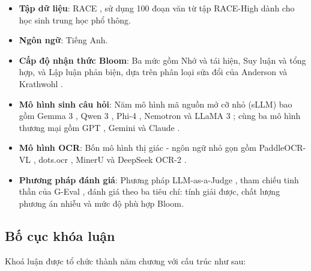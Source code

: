 \begin{itemize}
    \item \textbf{Tập dữ liệu}: RACE \cite{lai2017race}, sử dụng 100 đoạn văn từ tập RACE-High dành cho học sinh trung học phổ thông.
    \item \textbf{Ngôn ngữ}: Tiếng Anh.
    \item \textbf{Cấp độ nhận thức Bloom}: Ba mức gồm Nhớ và tái hiện, Suy luận và tổng hợp, và Lập luận phản biện, dựa trên phân loại sửa đổi của Anderson và Krathwohl \cite{anderson2001taxonomy}.
    \item \textbf{Mô hình sinh câu hỏi}: Năm mô hình mã nguồn mở cỡ nhỏ (sLLM) bao gồm Gemma 3 \cite{gemma2025}, Qwen 3 \cite{qwen2025}, Phi-4 \cite{phi4_2024}, Nemotron \cite{nemotron2025} và LLaMA 3 \cite{llama2024}; cùng ba mô hình thương mại gồm GPT \cite{gpt5_2025}, Gemini \cite{gemini2025} và Claude \cite{claude2025}.
    \item \textbf{Mô hình OCR}: Bốn mô hình thị giác - ngôn ngữ nhỏ gọn gồm PaddleOCR-VL \cite{paddleocr2025}, dots.ocr \cite{dotsocr2025}, MinerU \cite{mineru2025} và DeepSeek OCR-2 \cite{deepseekocr2025}.
    \item \textbf{Phương pháp đánh giá}: Phương pháp LLM-as-a-Judge \cite{zheng2023judging}, tham chiếu tinh thần của G-Eval \cite{liu2023geval}, đánh giá theo ba tiêu chí: tính giải được, chất lượng phương án nhiễu và mức độ phù hợp Bloom.
\end{itemize}

\subsection{Bố cục khóa luận}

Khoá luận được tổ chức thành năm chương với cấu trúc như sau:


